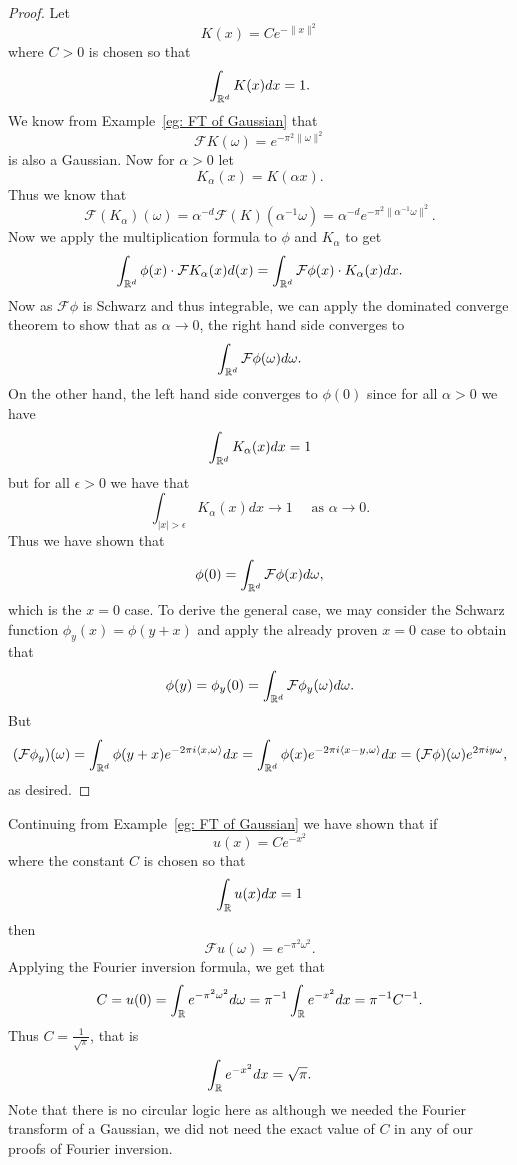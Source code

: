 \documentclass[twoside, a4paper, 10pt]{amsart}
\begin{document}
\begin{proof} Let $$K(x) = C e^{-\|x\|^2}$$ where $C>0$ is chosen so that $$\int_{\mathbb{R}^d} K(x) dx = 1.$$ We know from Example~\ref{eg: FT of Gaussian} that $$\mathcal{F}K(\omega) = e^{-\pi^2 \|\omega\|^2}$$ is also a Gaussian. Now for $\alpha>0$ let $$K_{\alpha}(x) = K(\alpha x).$$ Thus we know that $$\mathcal{F}(K_{\alpha}) (\omega) = \alpha^{-d} \mathcal{F}(K) (\alpha^{-1} \omega) = \alpha^{-d} e^{-\pi^2 \|\alpha^{-1} \omega\|^2}.$$ Now we apply the multiplication formula to $\phi$ and $K_{\alpha}$ to get $$ \int_{\mathbb{R}^d} \phi(x) \cdot \mathcal{F} K_{\alpha}(x) d(x) = \int_{\mathbb{R}^d} \mathcal{F} \phi (x) \cdot K_{\alpha}(x) dx.$$ Now as $\mathcal{F}\phi$ is Schwarz and thus integrable, we can apply the dominated converge theorem to show that as $\alpha \to 0$, the right hand side converges to $$\int_{\mathbb{R}^d} \mathcal{F}\phi(\omega) d\omega.$$ On the other hand, the left hand side converges to $\phi(0)$ since for all $\alpha>0$ we have $$\int_{\mathbb{R}^d} K_{\alpha}(x) dx = 1$$ but for all $\epsilon>0$ we have that $$\int_{|x|>\epsilon} K_{\alpha}(x) dx \to 1 \quad\text{ as } \alpha \to 0 .$$ Thus we have shown that $$\phi(0) = \int_{\mathbb{R}^d} \mathcal{F}\phi(x) d\omega,$$ which is the $x = 0$ case. To derive the general case, we may consider the Schwarz function $\phi_y (x) = \phi(y+x)$ and apply the already proven $x = 0$ case to obtain that $$\phi(y) = \phi_y(0) = \int_{\mathbb{R}^d} \mathcal{F}\phi_y(\omega) d\omega.$$ But $$(\mathcal{F}\phi_y) (\omega) = \int_{\mathbb{R}^d} \phi(y+x) e^{-2\pi i \langle x , \omega \rangle} dx =  \int_{\mathbb{R}^d} \phi(x) e^{-2\pi i \langle x - y , \omega \rangle} dx = (\mathcal{F}\phi)(\omega) e^{2\pi i y\omega},$$ as desired.

\end{proof}

\begin{eg} Continuing from Example~\ref{eg: FT of Gaussian} we have shown that if $$u(x) = C e^{-x^2}$$ where the constant $C$ is chosen so that $$\int_{\mathbb{R}} u(x) dx = 1$$ then $$\mathcal{F}u(\omega) =  e^{-\pi^2 \omega^2}.$$ Applying the Fourier inversion formula, we get that $$C = u(0) = \int_{\mathbb{R}} e^{-\pi^2 \omega^2} d\omega = \pi^{-1} \int_{\mathbb{R}} e^{-x^2} dx = \pi^{-1}C^{-1}. $$ Thus $C = \frac{1}{\sqrt{\pi}}$, that is $$\int_{\mathbb{R}} e^{-x^2} dx = \sqrt{\pi}.$$ Note that there is no circular logic here as although we needed the Fourier transform of a Gaussian, we did not need the exact value of $C$ in any of our proofs of Fourier inversion. \end{eg}
\end{document}
